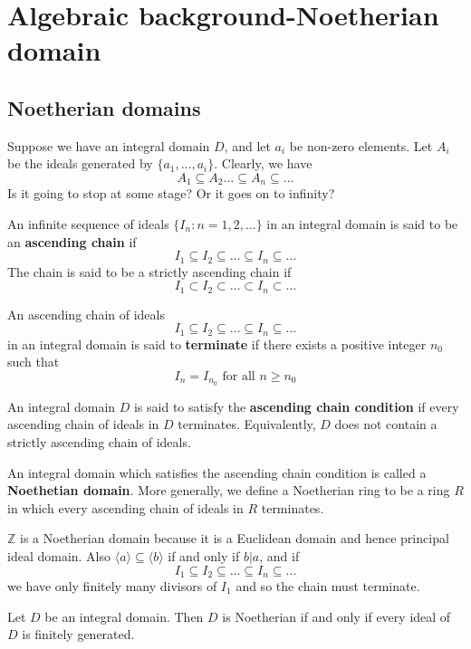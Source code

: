 \section{Algebraic background-Noetherian domain}
\subsection{Noetherian domains}
Suppose we have an integral domain $D$, and let $a_i$ be non-zero elements.
Let $A_i$ be the ideals generated by $\{a_1,\ldots,a_i\}$. Clearly, we have
$$A_1 \subseteq A_2 \ldots \subseteq A_n \subseteq \ldots$$
Is it going to stop at some stage? Or it goes on to infinity?
\begin{definition} An infinite sequence of ideals $\{I_n: n=1,2,\ldots\}$ in an integral domain is said to be an {\bf ascending chain} if
$$I_1 \subseteq I_2 \subseteq \ldots \subseteq I_n \subseteq \ldots$$
The chain is said to be a strictly ascending chain if
$$I_1 \subset I_2 \subset \ldots \subset I_n \subset \ldots$$
\end{definition}
\begin{definition} An ascending chain of ideals
$$I_1 \subseteq I_2 \subseteq \ldots \subseteq I_n \subseteq \ldots$$
in an integral domain is said to {\bf terminate} if there exists a positive integer $n_0$ such that
$$I_n = I_{n_0} \text{ for all } n \ge n_0$$
\end{definition}
\begin{definition} An integral domain $D$ is said to satisfy the {\bf ascending chain condition} if every ascending chain of ideals in $D$ terminates. Equivalently, $D$ does not contain a strictly ascending chain of ideals.
\end{definition}
\begin{definition} An integral domain which satisfies the ascending chain condition is called a
{\bf Noethetian domain}. More generally, we define a Noetherian ring to be a ring $R$ in which every ascending chain of ideals in $R$ terminates.
\end{definition}
\begin{example} $\mathbb{Z}$ is a Noetherian domain because it is a Euclidean domain and hence principal ideal domain. Also $\langle a \rangle \subseteq \langle b \rangle$ if and only if $b|a$, and if
$$I_1 \subseteq I_2 \subseteq \ldots \subseteq I_n \subseteq \ldots$$
we have only finitely many divisors of $I_1$ and so the chain must terminate.
\end{example}
\begin{theorem} Let $D$ be an integral domain. Then $D$ is Noetherian if and only if every ideal of $D$ is finitely generated.
\end{theorem}
